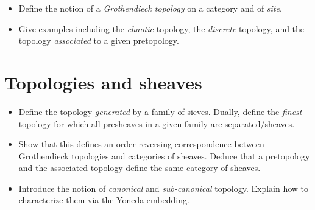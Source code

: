 \documentclass[12pt,a4paper]{amsart}
\theoremstyle{plain}
\theoremstyle{definition}
\theoremstyle{remark}
\begin{document}
{\color[rgb]{0.2,0.2,0.6}
\begin{itemize}
  \item Define the notion of a \textit{Grothendieck topology} on a category and of \textit{site}.
  \item Give examples including the \textit{chaotic} topology, the \textit{discrete} topology, and the topology \textit{associated} to a given pretopology.
\end{itemize}
}

\section{Topologies and sheaves}

{\color[rgb]{0.2,0.2,0.6}
\begin{itemize}
  \item Define the topology \textit{generated} by a family of sieves.
    Dually, define the \textit{finest} topology for which all presheaves in a given family are separated/sheaves.
  \item Show that this defines an order-reversing correspondence between Grothendieck topologies and categories of sheaves.
    Deduce that a pretopology and the associated topology define the same category of sheaves.
  \item Introduce the notion of \textit{canonical} and \textit{sub-canonical} topology.
    Explain how to characterize them via the Yoneda embedding.
\end{itemize}
}

\printbibliography
\vfill
\end{document}
